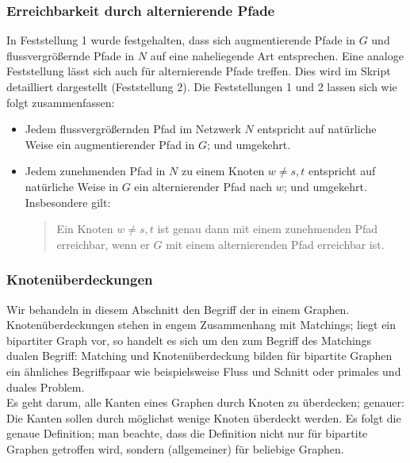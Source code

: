 \documentclass[smaller]{beamer}
\begin{document}
\begin{frame}
 \frametitle{Erreichbarkeit durch alternierende Pfade}
 In Feststellung 1 wurde festgehalten, dass sich augmentierende Pfade in $G$ und flussvergrößernde Pfade in $N$ auf eine naheliegende Art entsprechen. Eine analoge Feststellung lässt sich auch für alternierende Pfade treffen. Dies wird im Skript detailliert dargestellt (Feststellung 2). Die Feststellungen 1 und 2 lassen sich wie folgt zusammenfassen: 
 \begin{itemize}
 \item Jedem \alert{flussvergrößernden Pfad} im Netzwerk $N$ entspricht auf natürliche  
  Weise ein \alert{augmentierender Pfad} in $G$; und umgekehrt.
 \item Jedem \alert{zunehmenden Pfad} in $N$ zu einem Knoten $w \neq s,t$ entspricht auf 
  natürliche Weise in $G$ ein \alert{alternierender Pfad nach} $w$; und umgekehrt. 
  Insbesondere gilt: \vspace*{0.2cm}
  \begin{quote}
   \alert{Ein Knoten $w\neq s,t$ ist genau dann mit einem zunehmenden Pfad erreichbar, wenn er $G$ mit einem alternierenden Pfad erreichbar ist.}
  \end{quote}
  \end{itemize}
\end{frame}

\begin{frame}
 \frametitle{Knotenüberdeckungen}
 Wir behandeln in diesem Abschnitt den Begriff der  in einem Graphen. Knotenüberdeckungen stehen in engem Zusammenhang mit Matchings; liegt ein bipartiter Graph vor, so handelt es sich um den zum Begriff des Matchings {\glqq}dualen Begriff{\grqq}: Matching und Knotenüberdeckung bilden für bipartite Graphen ein ähnliches Begriffspaar wie beispielsweise \alert{Fluss und Schnitt} oder \alert{primales und duales Problem}. \\ \vspace*{0.2cm}
 Es geht darum, alle Kanten eines Graphen durch Knoten zu überdecken; genauer: Die Kanten sollen durch möglichst wenige Knoten überdeckt werden. Es folgt die genaue Definition; man beachte, dass die Definition nicht nur für bipartite Graphen getroffen wird, sondern (allgemeiner) für beliebige Graphen.
\end{frame}
\end{document}
